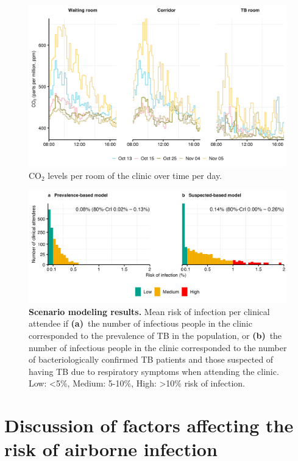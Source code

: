 \documentclass[fleqn,11pt]{wlscirep_supp}
\begin{document}
\begin{figure}[!htpb]
    \centering
    \includegraphics{results/data/co2-levels-over-time.png}
    \caption{CO$_2$ levels per room of the clinic over time per day.}
    \label{fig:co2-levels}
\end{figure}

\begin{figure}[!htpb]
    \centering
    \includegraphics{results/modeling/mean-roi-assumptions.png}
    \caption{\textbf{Scenario modeling results.} Mean risk of infection per clinical attendee if \textbf{(a)}~the number of infectious people in the clinic corresponded to the prevalence of TB in the population, or \textbf{(b)}~the number of infectious people in the clinic corresponded to the number of bacteriologically confirmed TB patients and those suspected of having TB due to respiratory symptoms when attending the clinic. Low: <5\%, Medium: 5-10\%, High: >10\% risk of infection.}
    \label{fig:assumptions-results}
\end{figure}

\clearpage

\section{Discussion of factors affecting the risk of airborne infection}\label{sec:depth-discussion}
\end{document}
